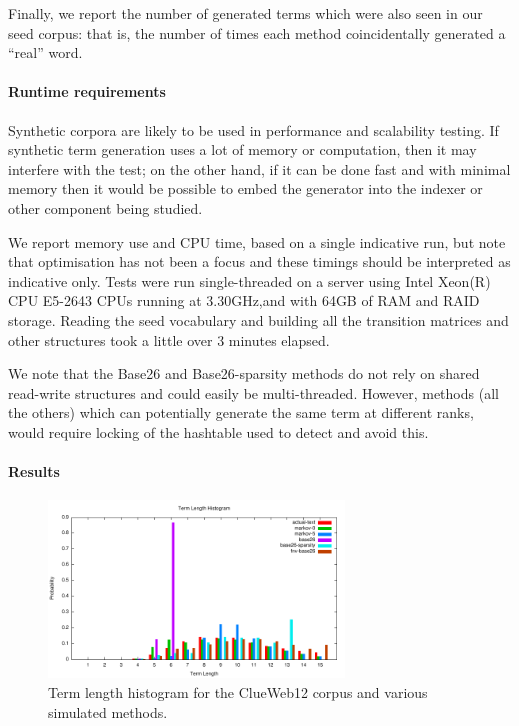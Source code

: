 \documentclass[11pt]{report}
\begin{document}
Finally, we report the number of generated terms which were also seen
in our seed corpus: that is, the number of times each method
coincidentally generated a ``real'' word.

\paragraph*{Runtime requirements}

Synthetic corpora are likely to be used in performance and scalability
testing. If synthetic term generation uses a lot of memory or
computation, then it may interfere with the test; on the other hand,
if it can be done fast and with minimal memory then it would be
possible to embed the generator into the indexer or other component
being studied.

We report memory use and CPU time, based on a single indicative run,
but note that optimisation has not been a focus and these timings
should be interpreted as indicative only. Tests were run
single-threaded on a server using Intel Xeon(R) CPU E5-2643 CPUs
running at 3.30GHz,and with 64GB of RAM and RAID storage.  Reading 
the seed vocabulary and building all the transition matrices and other 
structures took a little over 3 minutes elapsed.

We note that the Base26 and Base26-sparsity
methods do not rely on shared read-write structures and could easily be
multi-threaded.  However, methods (all the others) which can potentially generate the
same term at different ranks, would require locking of the hashtable
used to detect and avoid this.

\paragraph*{Results}
\begin{figure}
\centering
\includegraphics[width=0.7\textwidth]{images/ClueWeb12/termLengthHistogram.pdf}
\caption{Term length histogram for the ClueWeb12 corpus and various
  simulated methods. \label{plots} }
\end{figure}
\end{document}
